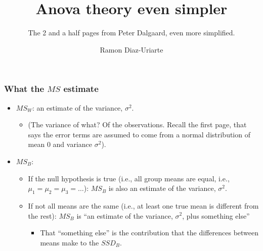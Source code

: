 \documentclass[bigger]{beamer}
\author{Ramon Diaz-Uriarte}
\title{Anova theory even simpler}
\subtitle{The 2 and a half pages from Peter Dalgaard, even more simplified.}
\begin{document}
 \maketitle


  




\begin{frame}
  \frametitle{What the $MS$ estimate}
  \begin{itemize}
  \item $MS_W$: an estimate of the variance, $\sigma^2$.
    \begin{itemize}
    \item {\tiny (The variance of what? Of the observations. Recall the
        first page, that says the error terms are assumed to come from a normal
        distribution of mean 0 and variance $\sigma^2$).}
    \end{itemize}

    \vspace*{20pt}
  \item $MS_B$:
    \begin{itemize}
    \item If the null hypothesis is true (i.e., all group means are equal, i.e.,
      $\mu_1 = \mu_2 = \mu_3 = \ldots$): $MS_B$ is also an estimate of the variance,
      $\sigma^2$.
          \vspace*{10pt}
    \item If not all means are the same (i.e., at least one true mean is
      different from the rest):  $MS_B$ is ``an estimate of the
      variance, $\sigma^2$, plus something else''
      \begin{itemize}
      \item That ``something else'' is the contribution that the differences
        between means make to the $SSD_B$. 
      \end{itemize}
    \end{itemize}
  \end{itemize}
\end{frame}
\end{document}
